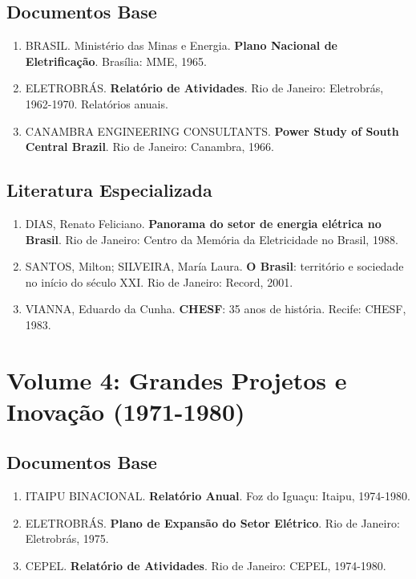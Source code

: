 \documentclass[12pt,a4paper]{report}
\begin{document}
\section*{Documentos Base}
\begin{enumerate}[leftmargin=*]
    \item BRASIL. Ministério das Minas e Energia. \textbf{Plano Nacional de Eletrificação}. Brasília: MME, 1965.
    
    \item ELETROBRÁS. \textbf{Relatório de Atividades}. Rio de Janeiro: Eletrobrás, 1962-1970. Relatórios anuais.
    
    \item CANAMBRA ENGINEERING CONSULTANTS. \textbf{Power Study of South Central Brazil}. Rio de Janeiro: Canambra, 1966.
\end{enumerate}

\section*{Literatura Especializada}
\begin{enumerate}[leftmargin=*]
    \item DIAS, Renato Feliciano. \textbf{Panorama do setor de energia elétrica no Brasil}. Rio de Janeiro: Centro da Memória da Eletricidade no Brasil, 1988.
    
    \item SANTOS, Milton; SILVEIRA, María Laura. \textbf{O Brasil}: território e sociedade no início do século XXI. Rio de Janeiro: Record, 2001.
    
    \item VIANNA, Eduardo da Cunha. \textbf{CHESF}: 35 anos de história. Recife: CHESF, 1983.
\end{enumerate}

\chapter*{Volume 4: Grandes Projetos e Inovação (1971-1980)}

\section*{Documentos Base}
\begin{enumerate}[leftmargin=*]
    \item ITAIPU BINACIONAL. \textbf{Relatório Anual}. Foz do Iguaçu: Itaipu, 1974-1980.
    
    \item ELETROBRÁS. \textbf{Plano de Expansão do Setor Elétrico}. Rio de Janeiro: Eletrobrás, 1975.
    
    \item CEPEL. \textbf{Relatório de Atividades}. Rio de Janeiro: CEPEL, 1974-1980.
\end{enumerate}
\end{document}
